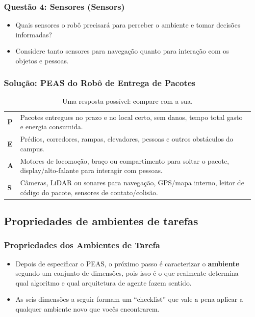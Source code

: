 \documentclass{beamer}
\begin{document}
\begin{frame}
\frametitle{Questão 4: Sensores (Sensors)}
\begin{itemize}
    \item Quais sensores o robô precisará para perceber o ambiente e tomar decisões informadas?
    \item Considere tanto sensores para navegação quanto para interação com os objetos e pessoas.
\end{itemize}
\end{frame}


\begin{frame}
\frametitle{Solução: PEAS do Robô de Entrega de Pacotes}
\begin{table}[h!]
\centering
\scriptsize
\begin{tabular}{@{}p{2.5cm}p{7.8cm}@{}}
\toprule
\textbf{P} & Pacotes entregues no prazo e no local certo, sem danos, tempo total gasto e energia consumida. \\
\textbf{E} & Prédios, corredores, rampas, elevadores, pessoas e outros obstáculos do campus. \\
\textbf{A} & Motores de locomoção, braço ou compartimento para soltar o pacote, display/alto-falante para interagir com pessoas. \\
\textbf{S} & Câmeras, LiDAR ou sonares para navegação, GPS/mapa interno, leitor de código do pacote, sensores de contato/colisão. \\
\bottomrule
\end{tabular}
\caption{Uma resposta possível: compare com a sua.}
\end{table}
\end{frame}


\subsection{Propriedades de ambientes de
tarefas}
\begin{frame}
\frametitle{Propriedades dos Ambientes de Tarefa}
\begin{itemize}
    \item Depois de especificar o PEAS, o próximo passo é caracterizar o \textbf{ambiente} segundo um conjunto de dimensões, pois isso é o que realmente determina qual algoritmo e qual arquitetura de agente fazem sentido.
    \item As seis dimensões a seguir formam um ``checklist'' que vale a pena aplicar a qualquer ambiente novo que vocês encontrarem.
\end{itemize}
\end{frame}
\end{document}
